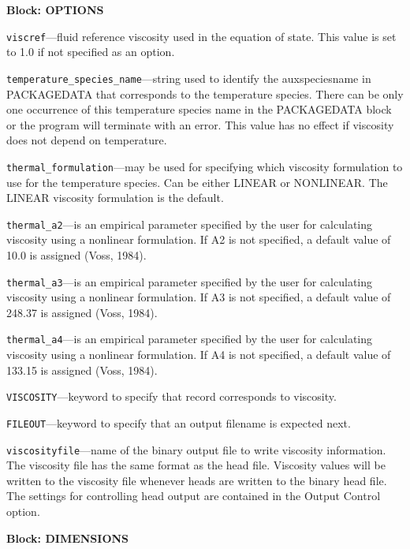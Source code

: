 
\item \textbf{Block: OPTIONS}

\begin{description}
\item \texttt{viscref}---fluid reference viscosity used in the equation of state.  This value is set to 1.0 if not specified as an option.

\item \texttt{temperature\_species\_name}---string used to identify the auxspeciesname in PACKAGEDATA that corresponds to the temperature species.  There can be only one occurrence of this temperature species name in the PACKAGEDATA block or the program will terminate with an error.  This value has no effect if viscosity does not depend on temperature.

\item \texttt{thermal\_formulation}---may be used for specifying which viscosity formulation to use for the temperature species. Can be either LINEAR or NONLINEAR. The LINEAR viscosity formulation is the default.

\item \texttt{thermal\_a2}---is an empirical parameter specified by the user for calculating viscosity using a nonlinear formulation.  If A2 is not specified, a default value of 10.0 is assigned (Voss, 1984).

\item \texttt{thermal\_a3}---is an empirical parameter specified by the user for calculating viscosity using a nonlinear formulation.  If A3 is not specified, a default value of 248.37 is assigned (Voss, 1984).

\item \texttt{thermal\_a4}---is an empirical parameter specified by the user for calculating viscosity using a nonlinear formulation.  If A4 is not specified, a default value of 133.15 is assigned (Voss, 1984).

\item \texttt{VISCOSITY}---keyword to specify that record corresponds to viscosity.

\item \texttt{FILEOUT}---keyword to specify that an output filename is expected next.

\item \texttt{viscosityfile}---name of the binary output file to write viscosity information.  The viscosity file has the same format as the head file.  Viscosity values will be written to the viscosity file whenever heads are written to the binary head file.  The settings for controlling head output are contained in the Output Control option.

\end{description}
\item \textbf{Block: DIMENSIONS}

